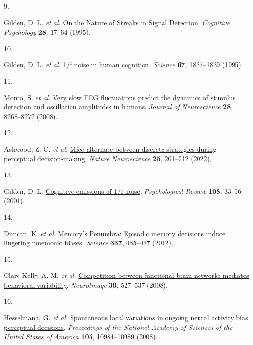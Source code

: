 \documentclass[
]{article}
\newlength{\cslhangindent}
\newlength{\csllabelwidth}
\newlength{\cslentryspacingunit} %
\newenvironment{CSLReferences}[2] %
 {%
  \setlength{\parindent}{0pt}
  \ifodd #1
  \let\oldpar\par
  \def\par{\hangindent=\cslhangindent\oldpar}
  \fi
  \setlength{\parskip}{#2\cslentryspacingunit}
 }%
 {}
\newcommand{\CSLLeftMargin}[1]{\parbox[t]{\csllabelwidth}{#1}}
\newcommand{\CSLRightInline}[1]{\parbox[t]{\linewidth - \csllabelwidth}{#1}\break}
\begin{document}
\begin{CSLReferences}{0}{0}
\leavevmode{}%
\CSLLeftMargin{9. }%
\CSLRightInline{Gilden, D. L. \emph{et al.}
\href{https://doi.org/10.1006/cogp.1995.1002}{{On the Nature of Streaks
in Signal Detection}}. \emph{Cognitive Psychology} \textbf{28}, 17--64
(1995).}

\leavevmode{}%
\CSLLeftMargin{10. }%
\CSLRightInline{Gilden, D. L. \emph{et al.}
\href{https://doi.org/10.1126/science.7892611}{1/f noise in human
cognition}. \emph{Science} \textbf{67}, 1837--1839 (1995).}

\leavevmode{}%
\CSLLeftMargin{11. }%
\CSLRightInline{Monto, S. \emph{et al.}
\href{https://doi.org/10.1523/JNEUROSCI.1910-08.2008}{{Very slow EEG
fluctuations predict the dynamics of stimulus detection and oscillation
amplitudes in humans}}. \emph{Journal of Neuroscience} \textbf{28},
8268--8272 (2008).}

\leavevmode{}%
\CSLLeftMargin{12. }%
\CSLRightInline{Ashwood, Z. C. \emph{et al.}
\href{https://doi.org/10.1038/s41593-021-01007-z}{{Mice alternate
between discrete strategies during perceptual decision-making}}.
\emph{Nature Neuroscience} \textbf{25}, 201--212 (2022).}

\leavevmode{}%
\CSLLeftMargin{13. }%
\CSLRightInline{Gilden, D. L.
\href{https://doi.org/10.1037/0033-295X.108.1.33}{{Cognitive emissions
of 1/f noise}}. \emph{Psychological Review} \textbf{108}, 33--56
(2001).}

\leavevmode{}%
\CSLLeftMargin{14. }%
\CSLRightInline{Duncan, K. \emph{et al.}
\href{https://doi.org/10.1126/science.1221936}{{Memory's Penumbra:
Episodic memory decisions induce lingering mnemonic biases}}.
\emph{Science} \textbf{337}, 485--487 (2012).}

\leavevmode{}%
\CSLLeftMargin{15. }%
\CSLRightInline{Clare Kelly, A. M. \emph{et al.}
\href{https://doi.org/10.1016/j.neuroimage.2007.08.008}{{Competition
between functional brain networks mediates behavioral variability}}.
\emph{NeuroImage} \textbf{39}, 527--537 (2008).}

\leavevmode{}%
\CSLLeftMargin{16. }%
\CSLRightInline{Hesselmann, G. \emph{et al.}
\href{https://doi.org/10.1073/pnas.0712043105}{{Spontaneous local
variations in ongoing neural activity bias perceptual decisions}}.
\emph{Proceedings of the National Academy of Sciences of the United
States of America} \textbf{105}, 10984--10989 (2008).}


\end{CSLReferences}
\end{document}
